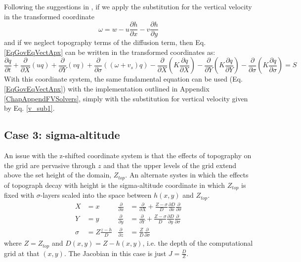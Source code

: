 Following the suggestions in \cite{Slordal02}, if we apply the substitution for the vertical
velocity in the transformed coordinate
\begin{equation}\label{v_sub1}
\omega = w - u \frac{\partial h}{\partial x} - v \frac{\partial h}{\partial y}
\end{equation}
and if we neglect topography terms of the diffusion term, then Eq. \ref{EqGovEqVectApx} can be
written in the transformed coordinates as:
\begin{equation}
\frac{\partial q}{\partial t} 
+ \frac{\partial }{\partial X} \left(uq\right)
+ \frac{\partial }{\partial Y}\left(vq\right)
+ \frac{\partial }{\partial \sigma}\left(\left( \omega + v_s \right) q\right)
- \frac{\partial}{\partial X} \left(K \frac{\partial q}{\partial X}\right) 
- \frac{\partial}{\partial Y} \left(K \frac{\partial q}{\partial Y}\right) 
- \frac{\partial}{\partial \sigma} \left(K \frac{\partial q}{\partial \sigma}\right) 
= S
\end{equation}
With this coordinate system, the same
fundamental equation can be used (Eq. \ref{EqGovEqVectApx}) with the implementation outlined
in Appendix \ref{ChapAppendFVSolvers}, simply with the substitution for vertical velocity given
by Eq. \ref{v_sub1}.

\subsection{Case 3: sigma-altitude}
An issue with the z-shifted coordinate system is that the effects of topography on the grid
are pervasive through $z$ and that the upper levels of the grid extend above the
set height of the domain, $Z_{top}$. An alternate systes in which the effects of
topograph decay with height is the sigma-altitude coordinate in which $Z_{top}$ is
fixed with $\sigma$-layers scaled into the space between $h(x,y)$ and $Z_{top}$.
\begin{align*}
X &= x &  \frac{\partial}{\partial x} &= \frac{\partial }{\partial X} + \frac{Z-\sigma}{D}\frac{\partial D}{\partial x}\frac{\partial }{\partial \sigma}\\
Y &= y &  \frac{\partial}{\partial y} &= \frac{\partial }{\partial Y} + \frac{Z-\sigma}{D}\frac{\partial D}{\partial y}\frac{\partial }{\partial \sigma}\\
\sigma &= Z \frac{z-h}{D} &  \frac{\partial}{\partial z} &= \frac{Z}{D} \frac{\partial}{\partial \sigma}
\end{align*}
where $Z=Z_{top}$ and $D(x,y)=Z-h(x,y)$, i.e. the depth of the computational grid at that $(x,y)$.
The Jacobian in this case is just $J=\frac{D}{Z}$.

